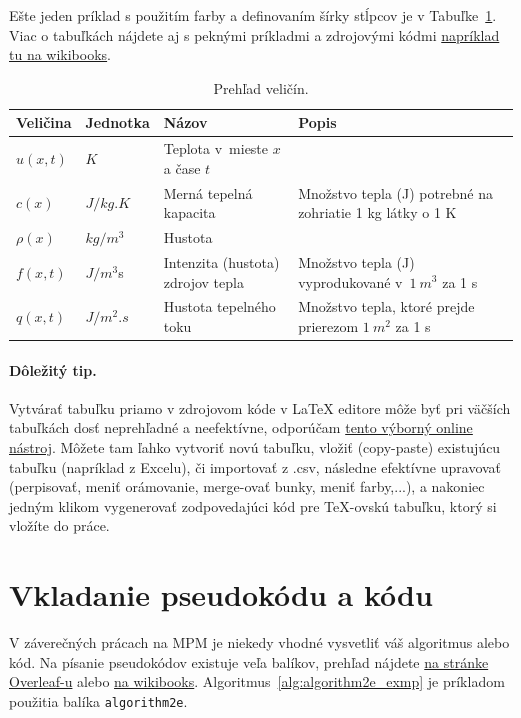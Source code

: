 Ešte jeden príklad s použitím farby a definovaním šírky stĺpcov je v Tabuľke~\ref{tab:Veliciny}. Viac o tabuľkách nájdete aj s peknými príkladmi a zdrojovými kódmi \href{https://en.wikibooks.org/wiki/LaTeX/Tables#Basic_examples}{napríklad tu na wikibooks}.
\begin{table}[h]
	\centering
	\caption{Prehľad veličín.} \label{tab:Veliciny}
	\begin{tabular}{|l|l|p{45mm}|p{60mm}|}
		\hline
		\rowcolor[gray]{.8}
		Veličina & Jednotka & Názov & Popis  \\ \hline
		$u(x,t)$ & $\si{K}$ & Teplota v~mieste $x$ a čase $t$ &   \\ \hline
		$c(x)$ & $\si{J/kg.K}$ & Merná tepelná kapacita & Množstvo tepla (J) potrebné na zohriatie 1 kg látky o 1 K  \\ \hline
		$\rho(x)$ & $\si{kg/m^3}$ & Hustota &  \\ \hline
		$f(x,t)$ & $\si{J/m^3}$s & Intenzita (hustota) \newline zdrojov tepla & Množstvo tepla (J) vyprodukované v~$\SI{1}{m^3}$ za 1 s   \\ \hline
		$q(x,t)$ & $\si{J/m^2.s}$ & Hustota tepelného toku & Množstvo tepla, ktoré prejde prierezom $\SI{1}{m^2}$ za 1 s  \\ \hline
	\end{tabular}
\end{table}

\paragraph{Dôležitý tip.}
Vytvárať tabuľku priamo v zdrojovom kóde v LaTeX editore môže byť pri väčších tabuľkách dosť neprehľadné a neefektívne, odporúčam \href{https://www.tablesgenerator.com/}{tento výborný online nástroj}. Môžete tam ľahko vytvoriť novú tabuľku, vložiť (copy-paste) existujúcu tabuľku (napríklad z Excelu), či importovať z .csv, následne efektívne upravovať (perpisovať, meniť orámovanie, merge-ovať bunky, meniť farby,...), a nakoniec jedným klikom vygenerovať zodpovedajúci kód pre TeX-ovskú tabuľku, ktorý si vložíte do práce.

\section{Vkladanie pseudokódu a kódu}

V záverečných prácach na MPM je niekedy vhodné vysvetliť váš algoritmus alebo kód. Na písanie pseudokódov existuje veľa balíkov, prehľad nájdete \href{https://www.overleaf.com/learn/latex/Algorithms}{na stránke Overleaf-u} alebo \href{https://en.wikibooks.org/wiki/LaTeX/Algorithms#The_algorithm_environment}{na wikibooks}. Algoritmus~\ref{alg:algorithm2e_exmp} je príkladom použitia balíka \verb|algorithm2e|.

